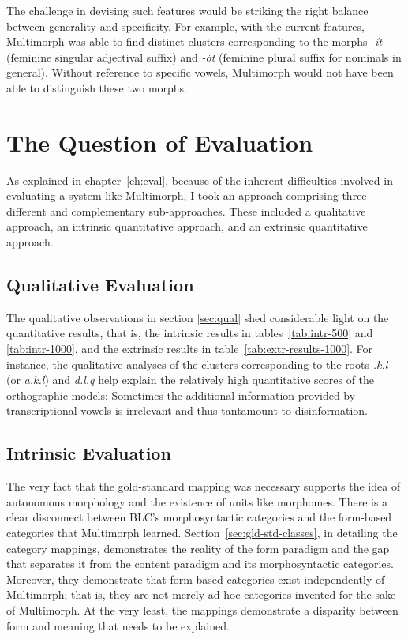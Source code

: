  The challenge in devising such features would be striking the right balance between generality and specificity.
 For example, with the current features, Multimorph was able to find distinct clusters corresponding to the morphs
 \textit{-\'{i}t} (feminine singular adjectival suffix) and \textit{-\'{o}t} (feminine plural suffix for nominals in general).
 Without reference to specific vowels, Multimorph would not have been able to distinguish these two morphs. 


\section{The Question of Evaluation}\label{sec:concl-eval}
As explained in chapter~\ref{ch:eval}, because of the inherent difficulties involved in evaluating a system like  Multimorph, I took an approach comprising three different and complementary sub-approaches. These included a qualitative approach, an intrinsic quantitative approach, and an extrinsic quantitative approach. 
\subsection{Qualitative Evaluation}
The qualitative observations in section \ref{sec:qual} shed considerable light on the quantitative results, that is, the intrinsic results in tables~\ref{tab:intr-500} and \ref{tab:intr-1000}, and the extrinsic results in table~\ref{tab:extr-results-1000}. For instance, the qualitative analyses of the clusters corresponding to the roots \textit{.k.l} (or \textit{a.k.l}) and \textit{d.l.q} help explain the relatively high quantitative scores of the orthographic models:
Sometimes the additional information provided by transcriptional vowels is irrelevant and thus tantamount to disinformation. 

\subsection{Intrinsic Evaluation}
The very fact that the gold-standard mapping was necessary supports the idea of autonomous morphology and the existence of units like morphomes.
There is a clear disconnect between BLC's morphosyntactic categories and the form-based categories that Multimorph learned.
 Section~\ref{sec:gld-std-classes}, in detailing the category mappings, demonstrates the reality of the form paradigm and the gap that separates it from the content paradigm and its morphosyntactic categories. Moreover, they demonstrate that form-based categories exist independently of Multimorph; that is, they are not merely ad-hoc categories invented for the sake of Multimorph. At the very least, the mappings demonstrate a disparity between form and meaning that needs to be explained.

